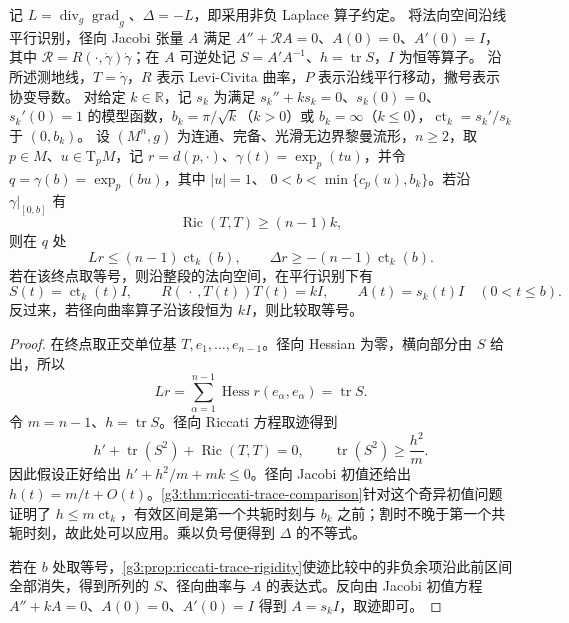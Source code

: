 \begin{theorem}\label{g3:thm:laplacian-comparison}
	记 \(L=\operatorname{div}_g\operatorname{grad}_g\)、\(\Delta=-L\)，即采用非负 Laplace 算子约定。
	将法向空间沿线平行识别，径向 Jacobi 张量 \(A\) 满足 \(A''+\mathcal RA=0\)、\(A(0)=0\)、\(A'(0)=I\)，其中 \(\mathcal R=R(\cdot,\dot\gamma)\dot\gamma\)；在 \(A\) 可逆处记 \(S=A'A^{-1}\)、\(h=\operatorname{tr}S\)，\(I\) 为恒等算子。
	沿所述测地线，\(T=\dot\gamma\)，\(R\) 表示 Levi-Civita 曲率，\(P\) 表示沿线平行移动，撇号表示协变导数。
	对给定 \(k\in\mathbb R\)，记 \(s_k\) 为满足 \(s_k''+ks_k=0\)、\(s_k(0)=0\)、\(s_k'(0)=1\) 的模型函数，\(b_k=\pi/\sqrt k\)（\(k>0\)）或 \(b_k=\infty\)（\(k\le0\)），\(\operatorname{ct}_k=s_k'/s_k\) 于 \((0,b_k)\)。
	设 \((M^n,g)\) 为连通、完备、光滑无边界黎曼流形，\(n\ge2\)，取 \(p\in M\)、\(u\in\mathrm T_pM\)，记 \(r=d(p,\cdot)\)、\(\gamma(t)=\exp_p(tu)\)，并令
	\(q=\gamma(b)=\exp_p(bu)\)，其中 \(|u|=1\)、
	\(0<b<\min\{c_p(u),b_k\}\)。若沿 \(\gamma|_{[0,b]}\) 有
	\[
		\operatorname{Ric}(T,T)\ge(n-1)k,
	\]
	则在 \(q\) 处
	\begin{equation}\label{g3:eq:laplacian-comparison-sign}
		Lr\le(n-1)\operatorname{ct}_k(b),
		\qquad
		\Delta r\ge-(n-1)\operatorname{ct}_k(b).
	\end{equation}
	若在该终点取等号，则沿整段的法向空间，在平行识别下有
	\[
		S(t)=\operatorname{ct}_k(t)I,\qquad
		R(\,\cdot\,,T(t))T(t)=kI,\qquad
		A(t)=s_k(t)I
		\quad(0<t\le b).
	\]
	反过来，若径向曲率算子沿该段恒为 \(kI\)，则比较取等号。
\end{theorem}
\begin{proof}
	在终点取正交单位基 \(T,e_1,\ldots,e_{n-1}\)。径向 Hessian 为零，横向部分由 \(S\) 给出，所以
	\[
		Lr=\sum_{\alpha=1}^{n-1}
		\operatorname{Hess}r(e_\alpha,e_\alpha)
		=\operatorname{tr}S.
	\]
	令 \(m=n-1\)、\(h=\operatorname{tr}S\)。径向 Riccati 方程取迹得到
	\[
		h'+\operatorname{tr}(S^2)+\operatorname{Ric}(T,T)=0,
		\qquad
		\operatorname{tr}(S^2)\ge\frac{h^2}{m}.
	\]
	因此假设正好给出
	\(h'+h^2/m+mk\le0\)。径向 Jacobi 初值还给出
	\(h(t)=m/t+O(t)\)。\cref{g3:thm:riccati-trace-comparison}针对这个奇异初值问题证明了
	\(h\le m\operatorname{ct}_k\)，有效区间是第一个共轭时刻与 \(b_k\) 之前；割时不晚于第一个共轭时刻，故此处可以应用。乘以负号便得到 \(\Delta\) 的不等式。

	若在 \(b\) 处取等号，\cref{g3:prop:riccati-trace-rigidity}使迹比较中的非负余项沿此前区间全部消失，得到所列的 \(S\)、径向曲率与 \(A\) 的表达式。反向由 Jacobi 初值方程
	\(A''+kA=0\)、\(A(0)=0\)、\(A'(0)=I\) 得到 \(A=s_kI\)，取迹即可。
\end{proof}

